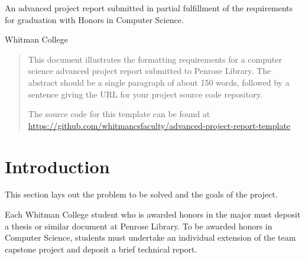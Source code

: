 \documentclass{article}
\begin{document}
\begin{titlepage}

\maketitle %

\begin{centering}

An advanced project report submitted in partial fulfillment of the
requirements for graduation with Honors in Computer Science.

\vfill %

Whitman College

\the\year

\end{centering}
\end{titlepage}





\begin{abstract}
This document illustrates the formatting requirements for a computer science advanced project report submitted to Penrose Library. The abstract should be a single paragraph of about 150 words, followed by a sentence giving the URL for your project source code repository.

The source code for this template can be found at
\url{https://github.com/whitmancsfaculty/advanced-project-report-template}
\end{abstract}

\section{Introduction}

This section lays out the problem to be solved and the goals of the project.

Each Whitman College student who is awarded honors in the major must deposit a thesis or similar document at Penrose Library.  To be awarded honors in Computer Science, students must undertake an individual extension of the team capstone project and deposit a brief technical report.
\end{document}
